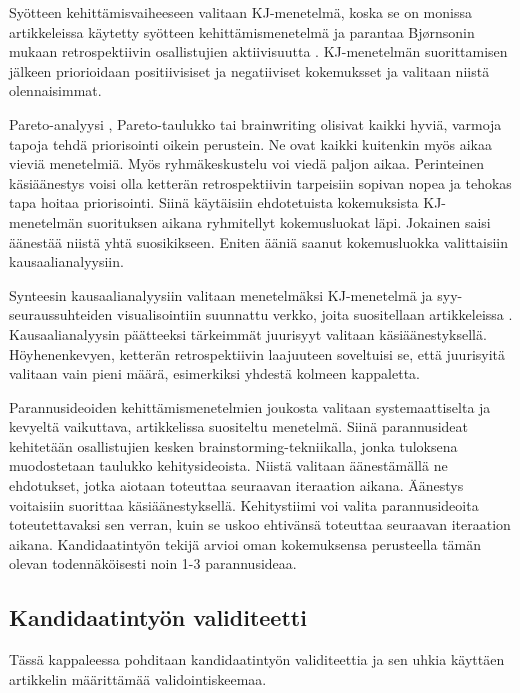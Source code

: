 Syötteen kehittämisvaiheeseen valitaan KJ-menetelmä, koska se on monissa artikkeleissa käytetty syötteen kehittämismenetelmä ja parantaa Bj{\o}rnsonin mukaan retrospektiivin osallistujien aktiivisuutta \citep{Bjornson2009}. KJ-menetelmän suorittamisen jälkeen priorioidaan positiivisiset ja negatiiviset kokemuksset ja valitaan niistä olennaisimmat.

Pareto-analyysi \citep{staalhane2004root}, Pareto-taulukko \citep{card1998learning, kalinowski2012evidence} tai brainwriting \citep{Lehtinen2011} olisivat kaikki hyviä, varmoja tapoja tehdä priorisointi oikein perustein. Ne ovat kaikki kuitenkin myös aikaa vieviä menetelmiä. Myös ryhmäkeskustelu \citep{staalhane2003post} voi viedä paljon aikaa. Perinteinen käsiäänestys voisi olla ketterän retrospektiivin tarpeisiin sopivan nopea ja tehokas tapa hoitaa priorisointi. Siinä käytäisiin ehdotetuista kokemuksista KJ-menetelmän suorituksen aikana ryhmitellyt kokemusluokat läpi. Jokainen saisi äänestää niistä yhtä suosikikseen. Eniten ääniä saanut kokemusluokka valittaisiin kausaalianalyysiin.

Synteesin kausaalianalyysiin valitaan menetelmäksi KJ-menetelmä ja syy-seuraussuhteiden visualisointiin suunnattu verkko, joita suositellaan artikkeleissa \citep{Lehtinen2011, Bjornson2009}. Kausaalianalyysin päätteeksi tärkeimmät juurisyyt valitaan käsiäänestyksellä. Höyhenenkevyen, ketterän retrospektiivin laajuuteen soveltuisi se, että juurisyitä valitaan vain pieni määrä, esimerkiksi yhdestä kolmeen kappaletta.

Parannusideoiden kehittämismenetelmien joukosta valitaan systemaattiselta ja kevyeltä vaikuttava, artikkelissa \citep{staalhane2004root} suositeltu menetelmä. Siinä parannusideat kehitetään osallistujien kesken brainstorming-tekniikalla, jonka tuloksena muodostetaan taulukko kehitysideoista. Niistä valitaan äänestämällä ne ehdotukset, jotka aiotaan toteuttaa \citep{staalhane2004root} seuraavan iteraation aikana. Äänestys voitaisiin suorittaa käsiäänestyksellä. Kehitystiimi voi valita parannusideoita toteutettavaksi sen verran, kuin se uskoo ehtivänsä toteuttaa seuraavan iteraation aikana. Kandidaatintyön tekijä arvioi oman kokemuksensa perusteella tämän olevan todennäköisesti noin 1-3 parannusideaa.

\subsection{Kandidaatintyön validiteetti}

Tässä kappaleessa pohditaan kandidaatintyön validiteettia ja sen uhkia käyttäen artikkelin \citep{runeson2009guidelines} määrittämää validointiskeemaa.

